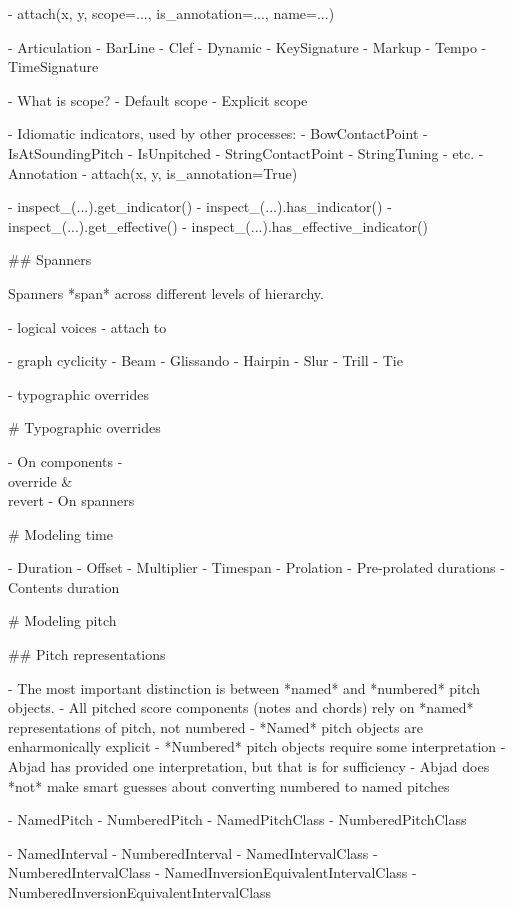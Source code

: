 \begin{markdown}
-   attach(x, y, scope=..., is_annotation=..., name=...)

-   Articulation
-   BarLine
-   Clef
-   Dynamic
-   KeySignature
-   Markup
-   Tempo
-   TimeSignature

-   What is scope?
-   Default scope
-   Explicit scope

-   Idiomatic indicators, used by other processes:
    -   BowContactPoint
    -   IsAtSoundingPitch
    -   IsUnpitched
    -   StringContactPoint
    -   StringTuning
    -   etc.
-   Annotation
-   attach(x, y, is_annotation=True)

-   inspect_(...).get_indicator()
-   inspect_(...).has_indicator()
-   inspect_(...).get_effective()
-   inspect_(...).has_effective_indicator()

## Spanners

Spanners *span* across different levels of hierarchy.

-   logical voices
-   attach to  

-   graph cyclicity
-   Beam
-   Glissando
-   Hairpin
-   Slur
-   Trill
-   Tie

-   typographic overrides

# Typographic overrides

-   On components
    - \\override & \\revert
-   On spanners

# Modeling time

-   Duration
-   Offset
-   Multiplier
-   Timespan
-   Prolation
-   Pre-prolated durations
-   Contents duration

# Modeling pitch

## Pitch representations

-   The most important distinction is between *named* and *numbered* pitch
    objects.
-   All pitched score components (notes and chords) rely on *named*
    representations of pitch, not numbered
-   *Named* pitch objects are enharmonically explicit
-   *Numbered* pitch objects require some interpretation
-   Abjad has provided one interpretation, but that is for sufficiency
-   Abjad does *not* make smart guesses about converting numbered to named
    pitches

-   NamedPitch
-   NumberedPitch
-   NamedPitchClass
-   NumberedPitchClass

-   NamedInterval
-   NumberedInterval
-   NamedIntervalClass
-   NumberedIntervalClass
-   NamedInversionEquivalentIntervalClass
-   NumberedInversionEquivalentIntervalClass


\end{markdown}
